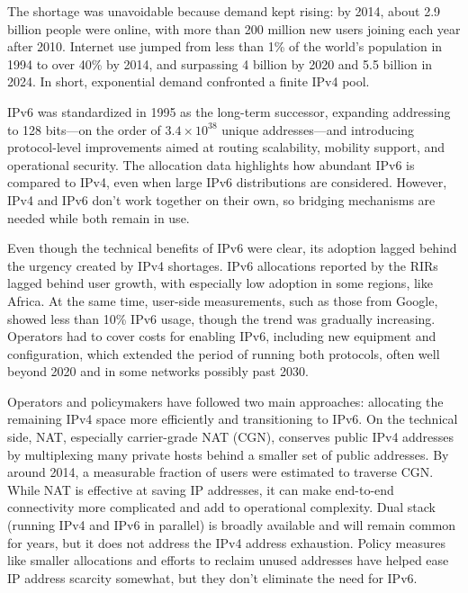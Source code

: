 The shortage was unavoidable because demand kept rising: by 2014, about 2.9 billion people were online, with more than 200 million new users joining each year after 2010. Internet use jumped from less than 1\% of the world’s population in 1994 to over 40\% by 2014, and surpassing 4 billion by 2020 and 5.5 billion in 2024\cite{7737362, itu_d_statistics}. In short, exponential demand confronted a finite IPv4 pool.

IPv6 was standardized in 1995 as the long-term successor, expanding addressing to 128 bits—on the order of $3.4 \times 10^{38}$ unique addresses—and introducing protocol-level improvements aimed at routing scalability, mobility support, and operational security\cite{rfc1883,7737362,LEVIN20141059}. The allocation data highlights how abundant IPv6 is compared to IPv4, even when large IPv6 distributions are considered\cite{7737362}. However, IPv4 and IPv6 don't work together on their own, so bridging mechanisms are needed while both remain in use\cite{LEVIN20141059}.

Even though the technical benefits of IPv6 were clear, its adoption lagged behind the urgency created by IPv4 shortages. IPv6 allocations reported by the RIRs lagged behind user growth, with especially low adoption in some regions, like Africa. At the same time, user-side measurements, such as those from Google, showed less than 10\% IPv6 usage, though the trend was gradually increasing\cite{7737362}. Operators had to cover costs for enabling IPv6, including new equipment and configuration, which extended the period of running both protocols, often well beyond 2020 and in some networks possibly past 2030\cite{7737362}.

Operators and policymakers have followed two main approaches: allocating the remaining IPv4 space more efficiently and transitioning to IPv6\cite{LEVIN20141059}. On the technical side, NAT, especially carrier-grade NAT (CGN), conserves public IPv4 addresses by multiplexing many private hosts behind a smaller set of public addresses\cite{rfc2663}. By around 2014, a measurable fraction of users were estimated to traverse CGN\cite{livadariu2018inferring}. While NAT is effective at saving IP addresses, it can make end-to-end connectivity more complicated and add to operational complexity\cite{rfc2993}. 
Dual stack (running IPv4 and IPv6 in parallel) is broadly available and will remain common for years, but it does not address the IPv4 address exhaustion\cite{LEVIN20141059}. Policy measures like smaller allocations and efforts to reclaim unused addresses have helped ease IP address scarcity somewhat, but they don't eliminate the need for IPv6\cite{LEVIN20141059}.

